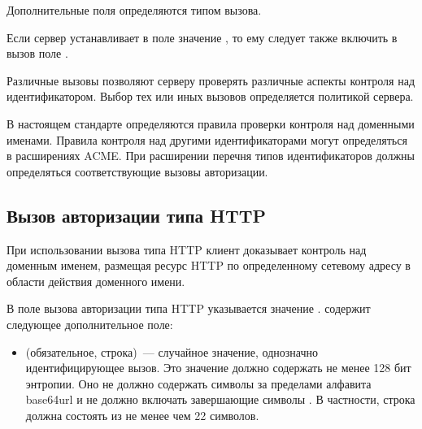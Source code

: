 
Дополнительные поля определяются типом вызова. 

Если сервер устанавливает в поле  значение , 
то ему следует также включить в вызов поле . 

Различные вызовы позволяют серверу проверять различные аспекты контроля над 
идентификатором. Выбор тех или иных вызовов определяется политикой сервера.
%

В настоящем стандарте определяются правила проверки контроля над доменными
именами. Правила контроля над другими идентификаторами могут определяться 
в расширениях ACME. При расширении перечня типов идентификаторов должны 
определяться соответствующие вызовы авторизации.


\subsection{Вызов авторизации типа HTTP}\label{ACME.Chall.HTTP}

При использовании вызова типа HTTP клиент доказывает контроль над доменным 
именем, размещая ресурс HTTP по определенному сетевому адресу в области 
действия доменного имени.



В поле  вызова авторизации типа HTTP указывается значение
.  содержит следующее 
дополнительное поле:

\begin{itemize}
\item
{} (обязательное, строка)~--- случайное значение, однозначно 
идентифицирующее вызов. Это значение должно содержать не менее 128 бит 
энтропии. Оно не должно содержать символы за пределами алфавита base64url и не 
должно включать завершающие символы \str{=}.
%
В частности, строка должна состоять из не менее чем 22 символов.
%
\end{itemize}

